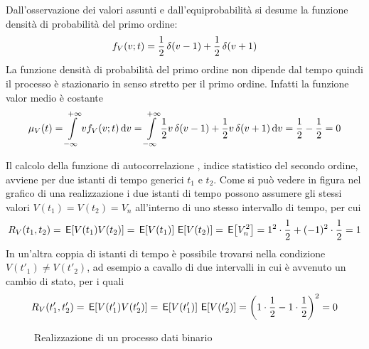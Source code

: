 Dall'osservazione dei valori assunti e dall'equiprobabilità si desume la funzione densità di probabilità del primo ordine:
\begin{equation}f_V(v;t)=\frac{1}{2}\operatorname{\delta}(v-1)+\frac{1}{2}\operatorname{\delta}(v+1)\end{equation}
La funzione densità di probabilità del primo ordine non dipende dal tempo quindi il processo è stazionario in senso stretto per il primo ordine. Infatti la funzione valor medio è costante
\begin{equation}\label{eq:segnale_binario_media}\mu_V(t)=\int\limits_{-\infty}^{+\infty}{v f_V(v;t)}{\,\mathop{}\!\mathrm{d}{v}}=\int\limits_{-\infty}^{+\infty}{\frac{1}{2}v\operatorname{\delta}(v-1)+\frac{1}{2}v\operatorname{\delta}(v+1)}{\,\mathop{}\!\mathrm{d}{v}}=\frac{1}{2}-\frac{1}{2}=0 \end{equation}

Il calcolo della funzione di autocorrelazione , indice statistico del secondo ordine, avviene per due istanti di tempo generici $t_1$ e $t_2$. Come si può vedere in figura nel grafico di una realizzazione i due istanti di tempo possono assumere gli stessi valori $V(t_1)=V(t_2)=V_n$ all'interno di uno stesso intervallo di tempo, per cui
\begin{equation}R_V(t_1,t_2)=\,{\operatorname{\mathsf{E}}}\!\left[{V(t_1)V(t_2)}\right]=\,{\operatorname{\mathsf{E}}}\!\left[{V(t_1)}\right]\,{\operatorname{\mathsf{E}}}\!\left[{V(t_2)}\right]=\,{\operatorname{\mathsf{E}}}\!\left[{V_n^2}\right]=1^2\cdot\frac{1}{2}+(-1)^2\cdot\frac{1}{2}=1\end{equation}
In un'altra coppia di istanti di tempo è possibile trovarsi nella condizione $V(t'_1)\neq V(t'_2)$, ad esempio a cavallo di due intervalli in cui è avvenuto un cambio di stato, per i quali
\begin{equation}R_V(t'_1,t'_2)=\,{\operatorname{\mathsf{E}}}\!\left[{V(t'_1)V(t'_2)}\right]=\,{\operatorname{\mathsf{E}}}\!\left[{V(t'_1)}\right]\,{\operatorname{\mathsf{E}}}\!\left[{V(t'_2)}\right]=\left(1\cdot\frac{1}{2}-1\cdot\frac{1}{2}\right)^2=0\end{equation}
\begin{figure}[h!]
	\centering{}
\caption{Realizzazione di un processo dati binario}\label{fig:processo_dati_binario}
\end{figure}

